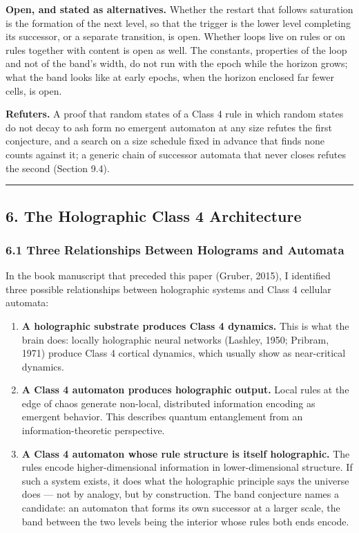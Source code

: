 \documentclass[
]{article}
\begin{document}
\textbf{Open, and stated as alternatives.} Whether the restart that
follows saturation is the formation of the next level, so that the
trigger is the lower level completing its successor, or a separate
transition, is open. Whether loops live on rules or on rules together
with content is open as well. The constants, properties of the loop and
not of the band's width, do not run with the epoch while the horizon
grows; what the band looks like at early epochs, when the horizon
enclosed far fewer cells, is open.

\textbf{Refuters.} A proof that random states of a Class 4 rule in which
random states do not decay to ash form no emergent automaton at any size
refutes the first conjecture, and a search on a size schedule fixed in
advance that finds none counts against it; a generic chain of successor
automata that never closes refutes the second (Section 9.4).

\begin{center}\rule{0.5\linewidth}{0.5pt}\end{center}

\hypertarget{the-holographic-class-4-architecture}{%
\subsection{6. The Holographic Class 4
Architecture}\label{the-holographic-class-4-architecture}}

\hypertarget{three-relationships-between-holograms-and-automata}{%
\subsubsection{6.1 Three Relationships Between Holograms and
Automata}\label{three-relationships-between-holograms-and-automata}}

In the book manuscript that preceded this paper (Gruber, 2015), I
identified three possible relationships between holographic systems and
Class 4 cellular automata:

\begin{enumerate}
\def\labelenumi{\arabic{enumi}.}
\item
  \textbf{A holographic substrate produces Class 4 dynamics.} This is
  what the brain does: locally holographic neural networks (Lashley,
  1950; Pribram, 1971) produce Class 4 cortical dynamics, which usually
  show as near-critical dynamics.
\item
  \textbf{A Class 4 automaton produces holographic output.} Local rules
  at the edge of chaos generate non-local, distributed information
  encoding as emergent behavior. This describes quantum entanglement
  from an information-theoretic perspective.
\item
  \textbf{A Class 4 automaton whose rule structure is itself
  holographic.} The rules encode higher-dimensional information in
  lower-dimensional structure. If such a system exists, it does what the
  holographic principle says the universe does --- not by analogy, but
  by construction. The band conjecture names a candidate: an automaton
  that forms its own successor at a larger scale, the band between the
  two levels being the interior whose rules both ends encode.
\end{enumerate}
\end{document}
